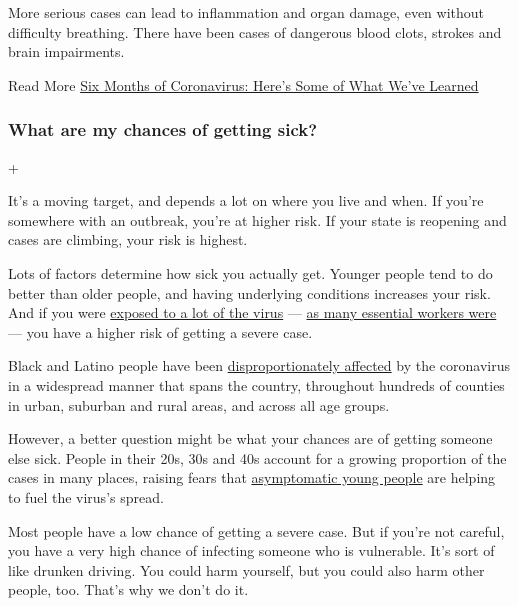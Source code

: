 More serious cases can lead to inflammation and organ damage, even
without difficulty breathing. There have been cases of dangerous blood
clots, strokes and brain impairments.

 Read More
\href{https://www.nytimes3xbfgragh.onion/article/coronavirus-facts-history.html\#link-6817bab5}{Six
Months of Coronavirus: Here's Some of What We've Learned}

\hypertarget{what-are-my-chances-of-getting-sick}{%
\subsubsection{What are my chances of getting
sick?}\label{what-are-my-chances-of-getting-sick}}

+

It's a moving target, and depends a lot on where you live and when. If
you're somewhere with an outbreak, you're at higher risk. If your state
is reopening and cases are climbing, your risk is highest.

Lots of factors determine how sick you actually get. Younger people tend
to do better than older people, and having underlying conditions
increases your risk. And if you were
\href{https://www.nytimes3xbfgragh.onion/2020/05/29/health/coronavirus-transmission-dose.html}{exposed
to a lot of the virus} ---
\href{https://www.nytimes3xbfgragh.onion/2020/04/24/magazine/surgeon-covid-diary.html}{as
many essential workers were} --- you have a higher risk of getting a
severe case.

Black and Latino people have been
\href{https://www.nytimes3xbfgragh.onion/interactive/2020/07/05/us/coronavirus-latinos-african-americans-cdc-data.html}{disproportionately
affected} by the coronavirus in a widespread manner that spans the
country, throughout hundreds of counties in urban, suburban and rural
areas, and across all age groups.

However, a better question might be what your chances are of getting
someone else sick. People in their 20s, 30s and 40s account for a
growing proportion of the cases in many places, raising fears that
\href{https://www.nytimes3xbfgragh.onion/2020/06/25/us/coronavirus-cases-young-people.html}{asymptomatic
young people} are helping to fuel the virus's spread.

Most people have a low chance of getting a severe case. But if you're
not careful, you have a very high chance of infecting someone who is
vulnerable. It's sort of like drunken driving. You could harm yourself,
but you could also harm other people, too. That's why we don't do it.

